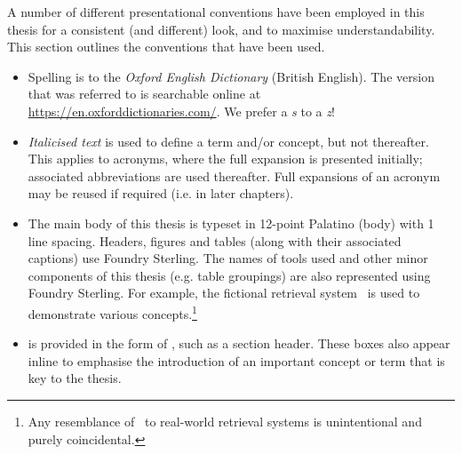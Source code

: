 
\begin{preamble}

A number of different presentational conventions have been employed in this thesis for a consistent (and different) look, and to maximise understandability. This section outlines the conventions that have been used.



\noindent{}
\begin{itemize}
    \item{Spelling is to the \emph{Oxford English Dictionary} (British English). The version that was referred to is searchable online at \url{https://en.oxforddictionaries.com/}. We prefer a \emph{s} to a \emph{z}!}
\end{itemize}

\noindent{}
\begin{itemize}
    \item{\emph{Italicised text} is used to define a term and/or concept, but not thereafter. This applies to acronyms, where the full expansion is presented initially; associated abbreviations are used thereafter. Full expansions of an acronym may be reused if required (i.e. in later chapters).}
    
    \item{The main body of this thesis is typeset in 12-point Palatino (body) with 1 line spacing. Headers, figures and tables (along with their associated captions) use \headerfont\selectfont Foundry Sterling\normalfont\selectfont. The names of tools used and other minor components of this thesis (e.g. table groupings) are also represented using \headerfont\selectfont Foundry Sterling\normalfont\selectfont. For example, the fictional retrieval system \searchlogo~is used to demonstrate various concepts.\footnote{Any resemblance of \searchlogo~to real-world retrieval systems is unintentional and purely coincidental.}}
    
    \item{ is provided in the form of , such as a section header. These boxes also appear inline to emphasise the introduction of an important concept or term that is key to the thesis.}
    
    \begin{itemize}
        

\end{itemize}
\end{itemize}
\end{preamble}
